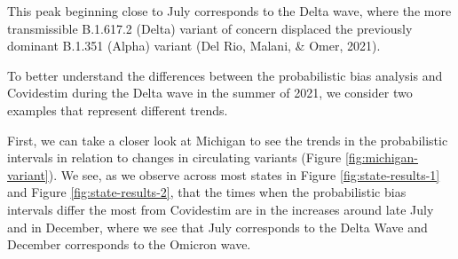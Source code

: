 \documentclass[12pt,twoside]{smiththesis}
\begin{document}
This peak beginning close to July corresponds to the Delta wave, where the more transmissible B.1.617.2 (Delta) variant of concern displaced the previously dominant B.1.351 (Alpha) variant (Del Rio, Malani, \& Omer, 2021).

To better understand the differences between the probabilistic bias analysis and Covidestim during the Delta wave in the summer of 2021, we consider two examples that represent different trends.

First, we can take a closer look at Michigan to see the trends in the probabilistic intervals in relation to changes in circulating variants (Figure \ref{fig:michigan-variant}). We see, as we observe across most states in Figure \ref{fig:state-results-1} and Figure \ref{fig:state-results-2}, that the times when the probabilistic bias intervals differ the most from Covidestim are in the increases around late July and in December, where we see that July corresponds to the Delta Wave and December corresponds to the Omicron wave.
\end{document}
